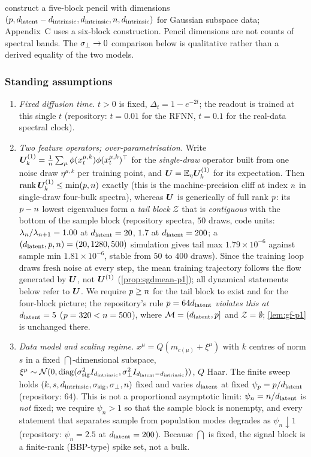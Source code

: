 \citet[Appendix~B]{george2025dsm} construct a five-block pencil with dimensions $(p,d_{\mathrm{latent}}-d_{\mathrm{intrinsic}},d_{\mathrm{intrinsic}},n,d_{\mathrm{intrinsic}})$ for Gaussian subspace data; Appendix~C uses a six-block construction. Pencil dimensions are not counts of spectral bands. The $\sigma_{\perp}\to0$ comparison below is qualitative rather than a derived equality of the two models.

\subsubsection{Standing assumptions}

\begin{assumption}\label{ass:standing-p1}
\begin{enumerate}
\item[(A1)] \emph{Fixed diffusion time.} $t>0$ is fixed, $\Delta_t=1-e^{-2t}$; the readout is trained at this single $t$ (repository: $t=0.01$ for the RFNN, $t=0.1$ for the real-data spectral clock).
\item[(A2)] \emph{Two feature operators; over-parametrisation.} Write $\bm{U}^{(1)}_k=\tfrac1{n}\sum_\mu\phi(x^{\mu,k}_t)\phi(x^{\mu,k}_t)^{\top}$ for the \emph{single-draw} operator built from one noise draw $\eta^{\mu,k}$ per training point, and $\bm{U}=\mathbb{E}_\eta\bm{U}^{(1)}_k$ for its expectation. Then $\operatorname{rank}\bm{U}^{(1)}_k\le\min(p,n)$ exactly (this is the machine-precision cliff at index $n$ in single-draw four-bulk spectra), whereas $\bm{U}$ is generically of full rank $p$: its $p-n$ lowest eigenvalues form a \emph{tail block} $\mathcal Z$ that is \emph{contiguous} with the bottom of the sample block (repository spectra, $50$ draws, code units: $\lambda_{n}/\lambda_{n+1}=1.00$ at $d_{\mathrm{latent}}=20$, $1.7$ at $d_{\mathrm{latent}}=200$; a $(d_{\mathrm{latent}},p,n)=(20,1280,500)$ simulation gives tail max $1.79\times10^{-6}$ against sample min $1.81\times10^{-6}$, stable from $50$ to $400$ draws). Since the training loop draws fresh noise at every step, the mean training trajectory follows the flow generated by $\bm{U}$, not $\bm{U}^{(1)}$ (\cref{prop:sgdmean-p1}); all dynamical statements below refer to $\bm{U}$. We require $p\ge n$ for the tail block to exist and for the four-block picture; the repository's rule $p=64d_{\mathrm{latent}}$ \emph{violates this at $d_{\mathrm{latent}}=5$} ($p=320<n=500$), where $\mathcal M=(d_{\mathrm{latent}},p]$ and $\mathcal Z=\emptyset$; \cref{lem:gf-p1} is unchanged there.
\item[(A3)] \emph{Data model and scaling regime.} $x^\mu=Q(m_{c(\mu)}+\xi^\mu)$ with $k$ centres of norm $s$ in a fixed $\dint$-dimensional subspace, $\xi^\mu\sim\mathcal N(0,\operatorname{diag}(\sigma_{\mathrm{sig}}^2I_{d_{\mathrm{intrinsic}}},\sigma_{\perp}^2I_{d_{\mathrm{latent}}-d_{\mathrm{intrinsic}}}))$, $Q$ Haar. The finite sweep holds $(k,s,d_{\mathrm{intrinsic}},\sigma_{\mathrm{sig}},\sigma_{\perp},n)$ fixed and varies $d_{\mathrm{latent}}$ at fixed $\psi_p=p/d_{\mathrm{latent}}$ (repository: $64$). This is not a proportional asymptotic limit: $\psi_n=n/d_{\mathrm{latent}}$ is \emph{not} fixed; we require $\psi_n>1$ so that the sample block is nonempty, and every statement that separates sample from population modes degrades as $\psi_n\downarrow1$ (repository: $\psi_n=2.5$ at $d_{\mathrm{latent}}=200$). Because $\dint$ is fixed, the signal block is a finite-rank (BBP-type) spike set, not a bulk.

\end{enumerate}
\end{assumption}
